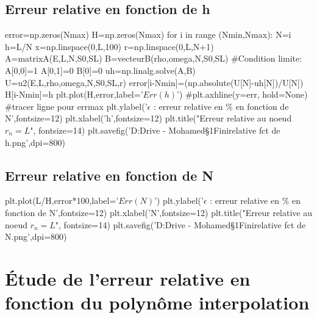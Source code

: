\documentclass[a4paper,10pt]{report} %
\begin{document}
\subsection{Erreur relative en fonction de h}

\begin{python}
error=np.zeros(Nmax)
H=np.zeros(Nmax)
for i in range (Nmin,Nmax):
    N=i
    h=L/N
    x=np.linspace(0,L,100)
    r=np.linspace(0,L,N+1)
    A=matrixA(E,L,N,S0,SL)
    B=vecteurB(rho,omega,N,S0,SL)
    #Condition limite:
    A[0,0]=1
    A[0,1]=0
    B[0]=0
    uh=np.linalg.solve(A,B)
    U=u2(E,L,rho,omega,N,S0,SL,r)
    error[i-Nmin]=(np.absolute(U[N]-uh[N])/U[N])
    H[i-Nmin]=h
plt.plot(H,error,label='$Err(h)$')
#plt.axhline(y=err, hold=None) #tracer ligne pour errmax
plt.ylabel('$\epsilon$ : erreur relative en $\%$ en fonction de N',fontsize=12)
plt.xlabel('h',fontsize=12)
plt.title("Erreur relative au noeud $r_{n}=L$", fontsize=14)
plt.savefig('D:\Google Drive - Mohamed\Cours\S1\Element Fini\Erreur relative fct de h.png',dpi=800) 
\end{python}
\subsection{Erreur relative en fonction de N}

\begin{python}
plt.plot(L/H,error*100,label='$Err(N)$')
plt.ylabel('$\epsilon$ : erreur relative en $\%$ en fonction de N',fontsize=12)
plt.xlabel('N',fontsize=12)
plt.title("Erreur relative au noeud $r_{n}=L$", fontsize=14)
plt.savefig('D:\Google Drive - Mohamed\Cours\S1\Element Fini\Erreur relative fct de N.png',dpi=800)
\end{python}

\section{Étude de l'erreur relative en fonction du polynôme interpolation}
\begin{python}
\end{python}
\end{document}

